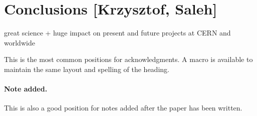 \documentclass[a4paper,11pt]{article}
\begin{document}
\newpage



\newpage

\section{Conclusions [Krzysztof, Saleh]}
\label{sec:conclusions}

great science + huge impact on present and future projects at CERN and worldwide

\newpage






\acknowledgments

This is the most common positions for acknowledgments. A macro is
available to maintain the same layout and spelling of the heading.

\paragraph{Note added.} This is also a good position for notes added
after the paper has been written.




\end{document}
